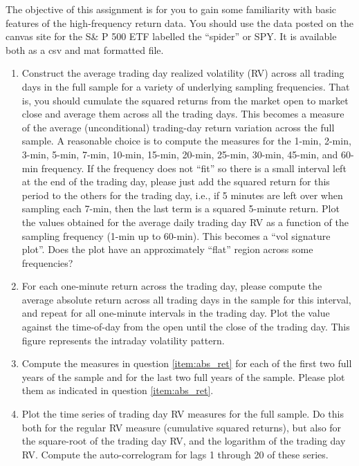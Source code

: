 The objective of this assignment is for you to gain some familiarity with basic features of the high-frequency return data. You should use the data posted on the canvas site for the S\& P 500 ETF labelled the ``spider'' or SPY. It is available both as a csv and mat formatted file.
\begin{enumerate}[label = \arabic*)]
    \item Construct the average trading day realized volatility (RV) across all trading days in the full sample for a variety of underlying sampling frequencies. That is, you should cumulate the squared returns from the market open to market close and average them across all the trading days. This becomes a measure of the average (unconditional) trading-day return variation across the full sample. A reasonable choice is to compute the measures for the 1-min, 2-min, 3-min, 5-min, 7-min, 10-min, 15-min, 20-min, 25-min, 30-min, 45-min, and 60-min frequency. If the frequency does not ``fit'' so there is a small interval left at the end of the trading day, please just add the squared return for this period to the others for the trading day, i.e., if 5 minutes are left over when sampling each 7-min, then the last term is a squared 5-minute return. Plot the values obtained for the average daily trading day RV as a function of the sampling frequency (1-min up to 60-min). This becomes a ``vol signature plot''. Does the plot have an approximately ``flat'' region across some frequencies?
    \item\label{item:abs_ret} For each one-minute return across the trading day, please compute the average absolute return across all trading days in the sample for this interval, and repeat for all one-minute intervals in the trading day. Plot the value against the time-of-day from the open until the close of the trading day. This figure represents the intraday volatility pattern.
    \item Compute the measures in question \ref{item:abs_ret} for each of the first two full years of the sample and for the last two full years of the sample. Please plot them as indicated in question \ref{item:abs_ret}.
    \item Plot the time series of trading day RV measures for the full sample. Do this both for the regular RV measure (cumulative squared returns), but also for the square-root of the trading day RV, and the logarithm of the trading day RV. Compute the auto-correlogram for lags 1 through 20 of these series.
\end{enumerate}